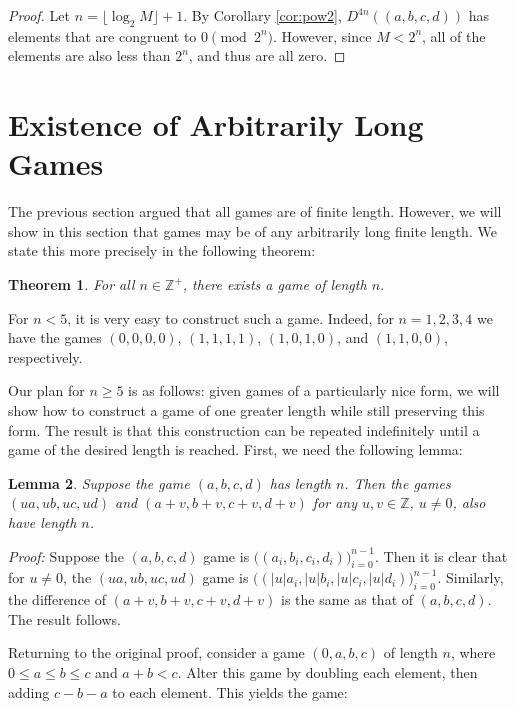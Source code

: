 \documentclass[12pt]{amsart}
\newtheorem{theorem}{Theorem}[section]
\newtheorem{lemma}[theorem]{Lemma}
\newcommand{\zp}{\mathbb{Z}^+}
\begin{document}
\begin{proof}
Let $n = \lfloor\log_2{M}\rfloor + 1$. By Corollary \ref {cor:pow2}, $D^{4n}((a, b, c, d))$ has elements that are congruent to $0\pmod{2^n}$. However, since $M < 2^n$, all of the elements are also less than $2^n$, and thus are all zero.
\end{proof}

\section{Existence of Arbitrarily Long Games\label{sec:longgames}}

The previous section argued that all games are of finite length. However, we will show in this section that games may be of any arbitrarily long finite length. We state this more precisely in the following theorem:

\begin{theorem}
For all $n\in \zp$, there exists a game of length $n$.
\end{theorem}

For $n < 5$, it is very easy to construct such a game. Indeed, for $n=1,2,3,4$ we have the games $(0, 0, 0, 0)$, $(1, 1, 1, 1)$, $(1, 0, 1, 0)$, and $(1, 1, 0, 0)$, respectively.

Our plan for $n \geq 5$ is as follows: given games of a particularly nice form, we will show how to construct a game of one greater length while still preserving this form. The result is that this construction can be repeated indefinitely until a game of the desired length is reached. First, we need the following lemma:

\begin{lemma}
Suppose the game $(a, b, c, d)$ has length $n$. Then the games $(ua, ub, uc, ud)$ and $(a + v, b + v, c + v, d + v)$ for any $u, v\in \mathbb{Z}$, $u\neq 0$, also have length $n$.
\end{lemma}

\textit{Proof:} Suppose the $(a, b, c, d)$ game is $\Big((a_i, b_i, c_i, d_i)\Big)_{i=0}^{n - 1}$. Then it is clear that for $u\neq 0$, the $(ua, ub, uc, ud)$ game is $\Big((|u|a_i, |u|b_i, |u|c_i, |u|d_i)\Big)_{i=0}^{n - 1}$. Similarly, the difference of $(a + v, b + v, c + v, d + v)$ is the same as that of $(a, b, c, d)$. The result follows.

Returning to the original proof, consider a game $(0, a, b, c)$ of length $n$, where $0\leq a\leq b\leq c$ and $a + b < c$. Alter this game by doubling each element, then adding $c - b - a$ to each element. This yields the game:
\end{document}
